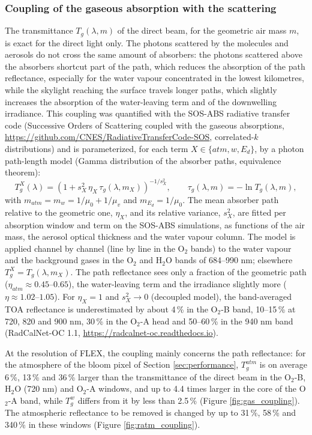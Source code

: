 \documentclass{article}
\begin{document}
\subsubsection{Coupling of the gaseous absorption with the scattering}\label{sec:coupling}
The transmittance $T_g(\lambda, m)$ of the direct beam, for the geometric air mass $m$, is exact for the direct light only.
The photons scattered by the molecules and aerosols do not cross the same amount of absorbers: the photons scattered above
the absorbers shortcut part of the path, which reduces the absorption of the path reflectance, especially for the water
vapour concentrated in the lowest kilometres, while the skylight reaching the surface travels longer paths, which slightly
increases the absorption of the water-leaving term and of the downwelling irradiance. This coupling was quantified with the
SOS-ABS radiative transfer code (Successive Orders of Scattering coupled with the gaseous absorptions,
\url{https://github.com/CNES/RadiativeTransferCode-SOS}, correlated-$k$ distributions) and is parameterized, for each term
$X \in \{atm, w, E_d\}$, by a photon path-length model (Gamma distribution of the absorber paths, equivalence theorem):
\begin{equation}
T_g^{X}(\lambda) = \left(1 + s_X^2\, \eta_X\, \tau_g(\lambda, m_X)\right)^{-1/s_X^2},
\qquad \tau_g(\lambda, m) = -\ln T_g(\lambda, m),
\label{eq:ppld}
\end{equation}
with $m_{atm} = m_w = 1/\mu_0 + 1/\mu_v$ and $m_{E_d} = 1/\mu_0$. The mean absorber path relative to the geometric one,
$\eta_X$, and its relative variance, $s_X^2$, are fitted per absorption window and term on the SOS-ABS simulations, as
functions of the air mass, the aerosol optical thickness and the water vapour column. The model is applied channel by
channel (line by line in the O$_2$ bands) to the water vapour and the background gases in the O$_2$ and H$_2$O bands of
684--990 nm; elsewhere $T_g^X = T_g(\lambda, m_X)$. The path reflectance sees only a fraction of the geometric path
($\eta_{atm} \approx 0.45$--$0.65$), the water-leaving term and the irradiance slightly more ($\eta \approx 1.02$--$1.05$).
For $\eta_X = 1$ and $s_X^2 \to 0$ (decoupled model), the band-averaged TOA reflectance is underestimated by about 4\,\% in
the O$_2$-B band, 10--15\,\% at 720, 820 and 900 nm, 30\,\% in the O$_2$-A head and 50--60\,\% in the 940 nm band
(RadCalNet-OC 1.1, \url{https://radcalnet-oc.readthedocs.io}).

At the resolution of FLEX, the coupling mainly concerns the path reflectance: for the atmosphere of the bloom pixel of
Section \ref{sec:performance}, $T_g^{atm}$ is on average 6\,\%, 13\,\% and 36\,\% larger than the transmittance of the
direct beam in the O$_2$-B, H$_2$O (720 nm) and O$_2$-A windows, and up to 4.4 times larger in the core of the O$_2$-A band,
while $T_g^{w}$ differs from it by less than 2.5\,\% (Figure \ref{fig:gas_coupling}). The atmospheric reflectance to be
removed is changed by up to 31\,\%, 58\,\% and 340\,\% in these windows (Figure \ref{fig:ratm_coupling}).
\end{document}
